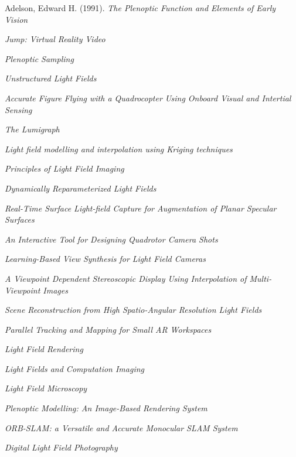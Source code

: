 \documentclass[12pt]{report}
\begin{document}
\begin{thebibliography}{10}%

	Adelson, Edward H. (1991). \emph{The Plenoptic Function and Elements of Early Vision}

	\emph{Jump: Virtual Reality Video}

	\emph{Plenoptic Sampling}

	\emph{Unstructured Light Fields}

	\emph{Accurate Figure Flying with a Quadrocopter Using Onboard Visual and Intertial Sensing}

	\emph{The Lumigraph}
	
	\emph{Light field modelling and interpolation using Kriging techniques}	
	
	\emph{Principles of Light Field Imaging}	
	
	\emph{Dynamically Reparameterized Light Fields}

	\emph{Real-Time Surface Light-field Capture for Augmentation of Planar Specular Surfaces}
	
	\emph{An Interactive Tool for Designing Quadrotor Camera Shots}

	\emph{Learning-Based View Synthesis for Light Field Cameras}

	\emph{A Viewpoint Dependent Stereoscopic Display Using Interpolation of Multi-Viewpoint Images}
	
	\emph{Scene Reconstruction from High Spatio-Angular Resolution Light Fields}	
	
	\emph{Parallel Tracking and Mapping for Small AR Workspaces}	
	
	\emph{Light Field Rendering}
	
	\emph{Light Fields and Computation Imaging}

	\emph{Light Field Microscopy}
	
	\emph{Plenoptic Modelling: An Image-Based Rendering System}

	\emph{ORB-SLAM: a Versatile and Accurate Monocular SLAM System}

	\emph{Digital Light Field Photography}	


\end{thebibliography}
\end{document}
